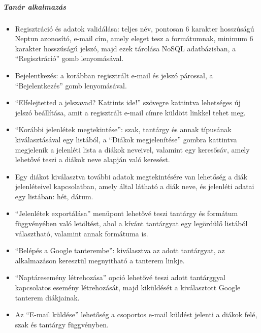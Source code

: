 \subparagraph*{Tanár alkalmazás}
\begin{itemize}
	\item {Regisztráció és adatok validálása: teljes név, pontosan 6 karakter hosszúságú Neptun azonosító, e-mail cím, amely eleget tesz a formátumnak, minimum 6 karakter hosszúságú jelszó, majd ezek tárolása NoSQL adatbázisban, a \enquote{Regisztráció} gomb lenyomásával.}
	
	\item {Bejelentkezés: a korábban regisztrált e-mail és jelszó párossal, a \enquote{Bejelentkezés} gomb lenyomásával.}
	
	\item{\enquote{Elfelejtetted a jelszavad? Kattints ide!} szövegre kattintva lehetséges új jelszó beállítása, amit a regisztrált e-mail címre küldött linkkel tehet meg.}
	
	\item {\enquote{Korábbi jelenlétek megtekintése}: szak, tantárgy és annak típusának kiválasztásával egy listából, a 
	\enquote{Diákok megjelenítése} gombra kattintva megjelenik a jelenléti lista a diákok neveivel, valamint egy keresősáv, amely lehetővé teszi a diákok neve alapján való keresést.}
	
	\item {Egy diákot kiválasztva további adatok megtekintésére van lehetőség a diák jelenléteivel kapcsolatban, amely által látható a diák neve, és jelenléti adatai egy listában: hét, dátum.}
	
	\item {\enquote{Jelenlétek exportálása} menüpont lehetővé teszi tantárgy és formátum függvényében való letöltést, ahol a kívánt tantárgyat egy legördülő listából választható, valamint annak formátuma is.}
	
	\item {\enquote{Belépés a Google tanterembe}: kiválasztva az adott tantárgyat, az alkalmazáson keresztül megnyitható a tanterem linkje.}
	
	\item {\enquote{Naptáresemény létrehozása} opció lehetővé teszi adott tantárggyal kapcsolatos esemény létrehozását, majd kiküldését a kiválasztott Google tanterem diákjainak.}
	
	\item {Az \enquote{E-mail küldése} lehetőség a csoportos e-mail küldést jelenti a diákok felé, szak és tantárgy függvényben.}\\
\end{itemize}


